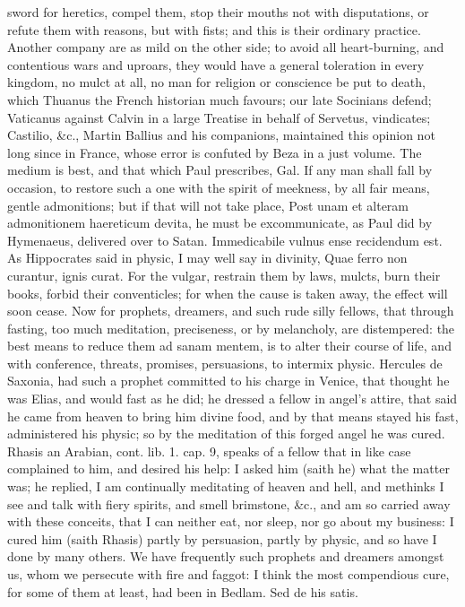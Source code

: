 {sword for heretics, compel them, stop their mouths not with
disputations, or refute them with reasons, but with fists; and this is
their ordinary practice. Another company are as mild on the other side;
to avoid all heart-burning, and contentious wars and uproars, they
would have a general toleration in every kingdom, no mulct at all, no
man for religion or conscience be put to death, which Thuanus the
French historian much favours; our late Socinians defend; Vaticanus
against Calvin in a large Treatise in behalf of Servetus, vindicates;
Castilio, \&c., Martin Ballius and his companions, maintained this
opinion not long since in France, whose error is confuted by Beza in a
just volume. The medium is best, and that which Paul prescribes, Gal.
 If any man shall fall by occasion, to restore such a one with the
spirit of meekness, by all fair means, gentle admonitions; but if that
will not take place, Post unam et alteram admonitionem haereticum
devita, he must be excommunicate, as Paul did by Hymenaeus, delivered
over to Satan. Immedicabile vulnus ense recidendum est. As Hippocrates
said in physic, I may well say in divinity, Quae ferro non curantur,
ignis curat. For the vulgar, restrain them by laws, mulcts, burn their
books, forbid their conventicles; for when the cause is taken away, the
effect will soon cease. Now for prophets, dreamers, and such rude silly
fellows, that through fasting, too much meditation, preciseness, or by
melancholy, are distempered: the best means to reduce them ad sanam
mentem, is to alter their course of life, and with conference, threats,
promises, persuasions, to intermix physic. Hercules de Saxonia, had
such a prophet committed to his charge in Venice, that thought he was
Elias, and would fast as he did; he dressed a fellow in angel's attire,
that said he came from heaven to bring him divine food, and by that
means stayed his fast, administered his physic; so by the meditation of
this forged angel he was cured. Rhasis an Arabian, cont. lib. 1.
cap. 9, speaks of a fellow that in like case complained to him, and
desired his help: I asked him (saith he) what the matter was; he
replied, I am continually meditating of heaven and hell, and methinks I
see and talk with fiery spirits, and smell brimstone, \&c., and am so
carried away with these conceits, that I can neither eat, nor sleep,
nor go about my business: I cured him (saith Rhasis) partly by
persuasion, partly by physic, and so have I done by many others. We
have frequently such prophets and dreamers amongst us, whom we
persecute with fire and faggot: I think the most compendious cure, for
some of them at least, had been in Bedlam. Sed de his satis.

}
